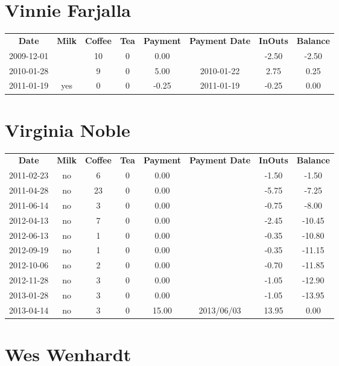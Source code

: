 \section{Vinnie Farjalla}

\begin{center}
\begin{tabular}{cccccccc}
\textbf{Date} & \textbf{Milk} & \textbf{Coffee} & \textbf{Tea} & \textbf{Payment} & \textbf{Payment Date} & \textbf{InOuts} & \textbf{Balance} \\
2009-12-01 &  & 10 & 0 &  0.00 &  & -2.50 & -2.50\\ 
2010-01-28 &  &  9 & 0 &  5.00 & 2010-01-22 &  2.75 &  0.25\\ 
2011-01-19 & yes &  0 & 0 & -0.25 & 2011-01-19 & -0.25 &  0.00
\end{tabular}
\end{center}

\section{Virginia Noble}

\begin{center}
\begin{tabular}{cccccccc}
\textbf{Date} & \textbf{Milk} & \textbf{Coffee} & \textbf{Tea} & \textbf{Payment} & \textbf{Payment Date} & \textbf{InOuts} & \textbf{Balance} \\
2011-02-23 & no &  6 & 0 &  0.00 &  & -1.50 &  -1.50\\ 
2011-04-28 & no & 23 & 0 &  0.00 &  & -5.75 &  -7.25\\ 
2011-06-14 & no &  3 & 0 &  0.00 &  & -0.75 &  -8.00\\ 
2012-04-13 & no &  7 & 0 &  0.00 &  & -2.45 & -10.45\\ 
2012-06-13 & no &  1 & 0 &  0.00 &  & -0.35 & -10.80\\ 
2012-09-19 & no &  1 & 0 &  0.00 &  & -0.35 & -11.15\\ 
2012-10-06 & no &  2 & 0 &  0.00 &  & -0.70 & -11.85\\ 
2012-11-28 & no &  3 & 0 &  0.00 &  & -1.05 & -12.90\\ 
2013-01-28 & no &  3 & 0 &  0.00 &  & -1.05 & -13.95\\ 
2013-04-14 & no &  3 & 0 & 15.00 & 2013/06/03 & 13.95 &   0.00
\end{tabular}
\end{center}

\section{Wes Wenhardt}

